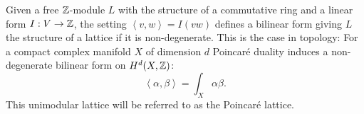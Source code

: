 \begin{example}
Given a free $\mathbb{Z}$-module $L$ with the structure of a commutative ring and a linear form $I:V\rightarrow \mathbb{Z}$, the setting $\left<v,w\right>=I(vw)$ defines a bilinear form giving $L$ the structure of a lattice if it is non-degenerate. This is the case in topology:
For a compact complex manifold $X$ of dimension $d$ Poincar\'e duality induces a non-degenerate bilinear form on $H^d(X,\mathbb{Z})$: 
$$
\left<\alpha,\beta\right> = \int_X\alpha\beta.
$$ 
This unimodular lattice will be referred to as the Poincar\'e lattice.
\end{example}